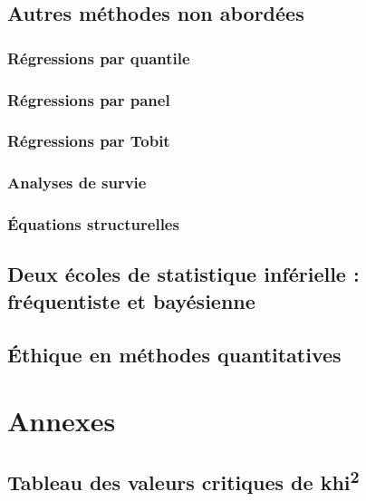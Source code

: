 \documentclass[
  11pt,
  french,
]{book}
\begin{document}
\hypertarget{sect112}{%
\section{Autres méthodes non abordées}\label{sect112}}

\hypertarget{sect1121}{%
\subsection{Régressions par quantile}\label{sect1121}}

\hypertarget{sect1122}{%
\subsection{Régressions par panel}\label{sect1122}}

\hypertarget{sect1123}{%
\subsection{Régressions par Tobit}\label{sect1123}}

\hypertarget{sect1124}{%
\subsection{Analyses de survie}\label{sect1124}}

\hypertarget{sect1125}{%
\subsection{Équations structurelles}\label{sect1125}}

\hypertarget{sect113}{%
\section{Deux écoles de statistique inférielle : fréquentiste et bayésienne}\label{sect113}}

\hypertarget{sect114}{%
\section{Éthique en méthodes quantitatives}\label{sect114}}

\hypertarget{annexes}{%
\chapter{Annexes}\label{annexes}}

\hypertarget{annexe1}{%
\section{\texorpdfstring{Tableau des valeurs critiques de khi\textsuperscript{2}}{Tableau des valeurs critiques de khi2}}\label{annexe1}}
\end{document}
